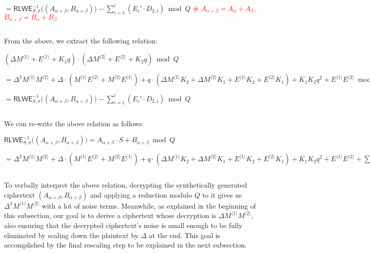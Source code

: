 $ = \textsf{RLWE}_{S, \sigma}^{-1}\bm((A_{\alpha+\beta}, B_{\alpha+\beta})\bm) - \sum\limits_{i=1}^{l} (E_i'\cdot D_{2,i}) \bmod Q$  \textcolor{red}{ \# $A_{\alpha+\beta} = A_{\alpha} + A_\beta$, \text{ } $B_{\alpha + \beta} = B_\alpha + B_\beta$}


$ $

From the above, we extract the following relation: 

$(\Delta M^{\langle 1 \rangle} + E^{\langle 1 \rangle} + K_1q) \cdot (\Delta M^{\langle 2 \rangle} + E^{\langle 2 \rangle} + K_2q) \bmod Q$

$=  \Delta^2M^{\langle 1 \rangle}M^{\langle 2 \rangle} + \Delta\cdot (M^{\langle 1 \rangle}E^{\langle 2 \rangle} + M^{\langle 2 \rangle}E^{\langle 1 \rangle}) + q\cdot(\Delta M^{\langle 1 \rangle}K_2 + \Delta M^{\langle 2 \rangle}K_1 + E^{\langle 1 \rangle}K_2 + E^{\langle 2 \rangle}K_1) + K_1 K_2 q^2 + E^{\langle 1 \rangle} E^{\langle 2 \rangle} \bmod Q$

$= \textsf{RLWE}_{S, \sigma}^{-1}\bm((A_{\alpha+\beta}, B_{\alpha+\beta})\bm) - \sum\limits_{i=1}^{l} (E_i'\cdot D_{2,i}) \bmod Q$  

$ $

We can re-write the above relation as follows:


$\textsf{RLWE}_{S, \sigma}^{-1}\bm((A_{\alpha+\beta}, B_{\alpha+\beta})\bm) = A_{\alpha+\beta}\cdot S + B_{\alpha+\beta} \bmod Q$

$ = \Delta^2M^{\langle 1 \rangle}M^{\langle 2 \rangle} + \Delta\cdot (M^{\langle 1 \rangle}E^{\langle 2 \rangle} + M^{\langle 2 \rangle}E^{\langle 1 \rangle}) + q\cdot(\Delta M^{\langle 1 \rangle}K_2 + \Delta M^{\langle 2 \rangle}K_1 + E^{\langle 1 \rangle}K_2 + E^{\langle 2 \rangle}K_1) + K_1 K_2 q^2 + E^{\langle 1 \rangle} E^{\langle 2 \rangle} + \sum\limits_{i=1}^{l} (E_i'\cdot D_{2,i}) \bmod Q$ 

$ $

To verbally interpret the above relation, decrypting the synthetically generated ciphertext $(A_{\alpha+\beta}, B_{\alpha+\beta})$ and applying a reduction modulo $Q$ to it gives us $\Delta^2 M^{\langle 1 \rangle}M^{\langle 2 \rangle}$ with a lot of noise terms. Meanwhile, as explained in the beginning of this subsection, our goal is to derive a ciphertext whose decryption is $\Delta M^{\langle 1 \rangle}M^{\langle 2 \rangle}$, also ensuring that the decrypted ciphertext's noise is small enough to be fully eliminated by scaling down the plaintext by $\Delta$ at the end. This goal is accomplished by the final rescaling step to be explained in the next subsection. 


